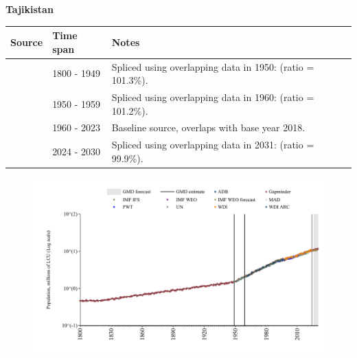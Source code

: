 \documentclass[12pt,a4paper,landscape]{article}
\begin{document}
\begin{adjustbox}{max totalsize={\paperwidth}{\paperheight},center}
\begin{minipage}[t][\textheight][t]{\textwidth}
\vspace*{0.5cm}
{}
\begin{center}
{\Large\bfseries Tajikistan}
\end{center}
\vspace{0.5cm}
\begin{table}[H]
\centering
\small
\begin{tabular}{|l|l|l|}
\hline
\textbf{Source} & \textbf{Time span} & \textbf{Notes} \\
\hline
\rowcolor{white}\cite{Gapminder}& 1800 - 1949 &Spliced using overlapping data in 1950: (ratio = 101.3\%).\\
\rowcolor{lightgray}\cite{IMF_IFS}& 1950 - 1959 &Spliced using overlapping data in 1960: (ratio = 101.2\%).\\
\rowcolor{white}\cite{WDI}& 1960 - 2023 &Baseline source, overlaps with base year 2018.\\
\rowcolor{lightgray}\cite{Gapminder}& 2024 - 2030 &Spliced using overlapping data in 2031: (ratio = 99.9\%).\\
\hline
\end{tabular}
\end{table}
\begin{figure}[H]
\centering
\includegraphics[width=\textwidth,height=0.6\textheight,keepaspectratio]{graphs/TJK_pop.pdf}
\end{figure}
\end{minipage}
\end{adjustbox}
\end{document}
